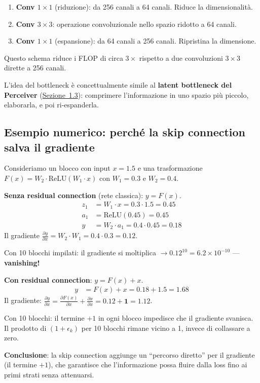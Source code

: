 \documentclass[12pt,a4paper]{article}
\begin{document}
\begin{formulabox}
\begin{enumerate}
    \item \textbf{Conv $1 \times 1$} (riduzione): da 256 canali a 64 canali. Riduce la dimensionalit\`a.
    \item \textbf{Conv $3 \times 3$}: operazione convoluzionale nello spazio ridotto a 64 canali.
    \item \textbf{Conv $1 \times 1$} (espansione): da 64 canali a 256 canali. Ripristina la dimensione.
\end{enumerate}
Questo schema riduce i FLOP di circa $3\times$ rispetto a due convoluzioni $3 \times 3$ dirette a 256 canali.
\end{formulabox}

L'idea del bottleneck \`e concettualmente simile al \textbf{latent bottleneck del Perceiver} (\hyperref[sec:latent_bottleneck]{Sezione~1.3}): comprimere l'informazione in uno spazio pi\`u piccolo, elaborarla, e poi ri-espanderla.

\subsection{Esempio numerico: perch\'e la skip connection salva il gradiente}

\begin{examplebox}
Consideriamo un blocco con input $x = 1.5$ e una trasformazione $F(x) = W_2 \cdot \text{ReLU}(W_1 \cdot x)$ con $W_1 = 0.3$ e $W_2 = 0.4$.

\textbf{Senza residual connection} (rete classica): $y = F(x)$.
\begin{align*}
    z_1 &= W_1 \cdot x = 0.3 \cdot 1.5 = 0.45 \\
    a_1 &= \text{ReLU}(0.45) = 0.45 \\
    y &= W_2 \cdot a_1 = 0.4 \cdot 0.45 = 0.18
\end{align*}
Il gradiente $\frac{\partial y}{\partial x} = W_2 \cdot W_1 = 0.4 \cdot 0.3 = \mathbf{0.12}$.

Con 10 blocchi impilati: il gradiente si moltiplica $\to 0.12^{10} = 6.2 \times 10^{-10}$ --- \textbf{vanishing!}

\textbf{Con residual connection}: $y = F(x) + x$.
\begin{align*}
    y &= F(x) + x = 0.18 + 1.5 = 1.68
\end{align*}
Il gradiente: $\frac{\partial y}{\partial x} = \frac{\partial F(x)}{\partial x} + \frac{\partial x}{\partial x} = 0.12 + \mathbf{1} = \mathbf{1.12}$.

Con 10 blocchi: il termine $+1$ in ogni blocco impedisce che il gradiente svanisca. Il prodotto di $(1 + \epsilon_k)$ per 10 blocchi rimane vicino a 1, invece di collassare a zero.

\textbf{Conclusione}: la skip connection aggiunge un ``percorso diretto'' per il gradiente (il termine $+1$), che garantisce che l'informazione possa fluire dalla loss fino ai primi strati senza attenuarsi.
\end{examplebox}
\end{document}
